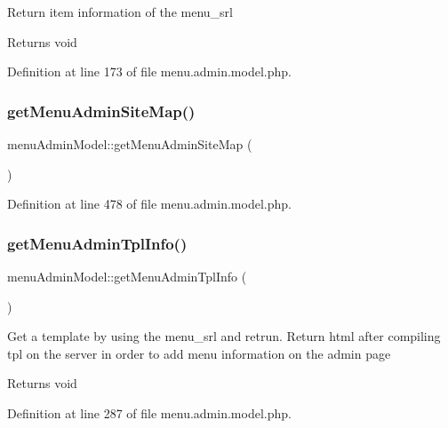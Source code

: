 Return item information of the menu\+\_\+srl \begin{DoxyReturn}{Returns}
void 
\end{DoxyReturn}


Definition at line 173 of file menu.\+admin.\+model.\+php.

\mbox{\label{classmenuAdminModel_adaae66f6de001bdaa33b72bcc83a6747}} 
\subsubsection{\texorpdfstring{get\+Menu\+Admin\+Site\+Map()}{getMenuAdminSiteMap()}}
{\footnotesize\ttfamily menu\+Admin\+Model\+::get\+Menu\+Admin\+Site\+Map (\begin{DoxyParamCaption}{ }\end{DoxyParamCaption})}



Definition at line 478 of file menu.\+admin.\+model.\+php.

\mbox{\label{classmenuAdminModel_a9f938b72f1488559cab19e9011ae7076}} 
\subsubsection{\texorpdfstring{get\+Menu\+Admin\+Tpl\+Info()}{getMenuAdminTplInfo()}}
{\footnotesize\ttfamily menu\+Admin\+Model\+::get\+Menu\+Admin\+Tpl\+Info (\begin{DoxyParamCaption}{ }\end{DoxyParamCaption})}

Get a template by using the menu\+\_\+srl and retrun. Return html after compiling tpl on the server in order to add menu information on the admin page \begin{DoxyReturn}{Returns}
void 
\end{DoxyReturn}


Definition at line 287 of file menu.\+admin.\+model.\+php.

\mbox{\label{classmenuAdminModel_a358509545ff88093b02be04c6599796d}} 
